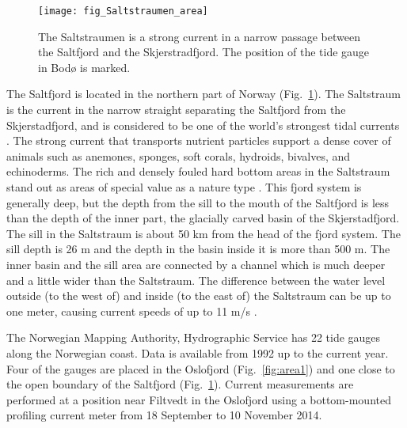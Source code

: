 \begin{figure}[!t]
\centering
\texttt{[image: fig\_Saltstraumen\_area]}
\caption{The Saltstraumen is a strong current in a narrow passage between the Saltfjord and the Skjerstradfjord. The position of the tide gauge in Bod{\o} is marked.}
\label{fig:area2}
\end{figure}

The Saltfjord is located in the northern part of Norway (Fig.~\ref{fig:area2}). The Saltstraum is the current in the narrow straight separating the Saltfjord from the Skjerstadfjord, and is considered to be one of the world's strongest tidal currents \cite[]{gjevik09}. The strong current that transports nutrient particles support a dense cover of animals such as anemones, sponges, soft corals, hydroids, bivalves, and echinoderms. The rich and densely fouled hard bottom areas in the Saltstraum stand out as areas of special value as a nature type \cite[]{fagerli15}. This fjord system is generally deep, but the depth from the sill to the mouth of the Saltfjord is less than the depth of the inner part, the glacially carved basin of the Skjerstadfjord. The sill in the Saltstraum is about 50 km from the head of the fjord system. The sill depth is 26 m and the depth in the basin inside it is more than 500 m. The inner basin and the sill area are connected by a channel which is much deeper and a little wider than the Saltstraum. The difference between the water level outside (to the west of) and inside (to the east of) the Saltstraum can be up to one meter, causing current speeds of up to 11 m/s \cite[]{eliassen01}.

The Norwegian Mapping Authority, Hydrographic Service has 22 tide gauges along the Norwegian coast. Data is available from 1992 up to the current year. Four of the gauges are placed in the Oslofjord  (Fig.~\ref{fig:area1}) and one close to the open boundary of the Saltfjord (Fig.~\ref{fig:area2}). Current measurements are performed at a position near Filtvedt in the Oslofjord using a bottom-mounted profiling current meter from 18 September to 10 November 2014.

